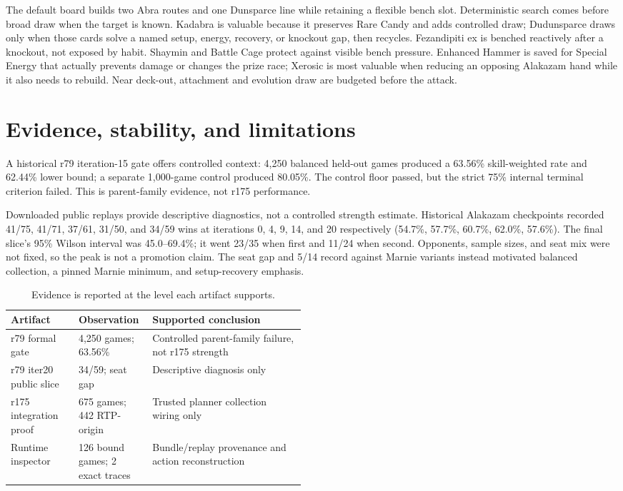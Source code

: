 \documentclass[10pt]{article}
\begin{document}
The default board builds two Abra routes and one Dunsparce line while retaining a flexible bench slot. Deterministic search comes before broad draw when the target is known. Kadabra is valuable because it preserves Rare Candy and adds controlled draw; Dudunsparce draws only when those cards solve a named setup, energy, recovery, or knockout gap, then recycles. Fezandipiti ex is benched reactively after a knockout, not exposed by habit. Shaymin and Battle Cage protect against visible bench pressure. Enhanced Hammer is saved for Special Energy that actually prevents damage or changes the prize race; Xerosic is most valuable when reducing an opposing Alakazam hand while it also needs to rebuild. Near deck-out, attachment and evolution draw are budgeted before the attack.

\section*{Evidence, stability, and limitations}

A historical r79 iteration-15 gate offers controlled context: 4,250 balanced held-out games produced a 63.56\% skill-weighted rate and 62.44\% lower bound; a separate 1,000-game control produced 80.05\%. The control floor passed, but the strict 75\% internal terminal criterion failed. This is parent-family evidence, not r175 performance.

Downloaded public replays provide descriptive diagnostics, not a controlled strength estimate. Historical Alakazam checkpoints recorded 41/75, 41/71, 37/61, 31/50, and 34/59 wins at iterations 0, 4, 9, 14, and 20 respectively (54.7\%, 57.7\%, 60.7\%, 62.0\%, 57.6\%). The final slice's 95\% Wilson interval was 45.0--69.4\%; it went 23/35 when first and 11/24 when second. Opponents, sample sizes, and seat mix were not fixed, so the peak is not a promotion claim. The seat gap and 5/14 record against Marnie variants instead motivated balanced collection, a pinned Marnie minimum, and setup-recovery emphasis.

\begin{table}[htbp]
\centering
\small
\caption{Evidence is reported at the level each artifact supports.}
\begin{tabularx}{\linewidth}{p{0.23\linewidth}p{0.25\linewidth}X}
\toprule
Artifact & Observation & Supported conclusion \\
\midrule
r79 formal gate & 4,250 games; 63.56\% & Controlled parent-family failure, not r175 strength \\
r79 iter20 public slice & 34/59; seat gap & Descriptive diagnosis only \\
r175 integration proof & 675 games; 442 RTP-origin & Trusted planner collection wiring only \\
Runtime inspector & 126 bound games; 2 exact traces & Bundle/replay provenance and action reconstruction \\
\bottomrule
\end{tabularx}
\end{table}
\end{document}
